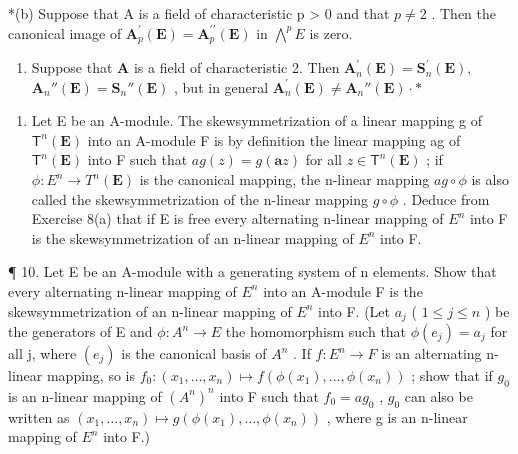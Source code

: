 *(b) Suppose that A is a field of characteristic p \textgreater{} 0 and that \(p \neq 2\) . Then the canonical image of \(\mathbf{A}_{p}^{\prime}(\mathbf{E}) = \mathbf{A}_{p}^{\prime\prime}(\mathbf{E})\) in \(\bigwedge^{p} E\) is zero.

\begin{enumerate}
\def\labelenumi{(\alph{enumi})}
\setcounter{enumi}{2}
\tightlist
\item
  Suppose that \(\mathbf{A}\) is a field of characteristic 2. Then \(\mathbf{A}_n^\prime (\mathbf{E}) = \mathbf{S}_n^\prime (\mathbf{E}),\) \(\mathbf{A}_n''(\mathbf{E}) = \mathbf{S}_n''(\mathbf{E})\) , but in general \(\mathbf{A}_n^\prime (\mathbf{E})\neq \mathbf{A}_n''(\mathbf{E})\cdot *\)
\end{enumerate}

\begin{enumerate}
\def\labelenumi{\arabic{enumi}.}
\setcounter{enumi}{8}
\tightlist
\item
  Let E be an A-module. The skewsymmetrization of a linear mapping g of \(\mathsf{T}^{n}(\mathbf{E})\) into an A-module F is by definition the linear mapping ag of \(\mathsf{T}^{n}(\mathbf{E})\) into F such that \(ag(z) = g(\boldsymbol{a}z)\) for all \(z \in \mathsf{T}^{n}(\mathbf{E})\) ; if \(\phi: E^{n} \to T^{n}(\mathbf{E})\) is the canonical mapping, the n-linear mapping \(ag \circ \phi\) is also called the skewsymmetrization of the n-linear mapping \(g \circ \phi\) . Deduce from Exercise 8(a) that if E is free every alternating n-linear mapping of \(E^{n}\) into F is the skewsymmetrization of an n-linear mapping of \(E^{n}\) into F.
\end{enumerate}

¶ 10. Let E be an A-module with a generating system of n elements. Show that every alternating n-linear mapping of \(E^{n}\) into an A-module F is the skewsymmetrization of an n-linear mapping of \(E^{n}\) into F. (Let \(a_{j}\) ( \(1 \leqslant j \leqslant n\) ) be the generators of E and \(\phi: A^{n} \rightarrow E\) the homomorphism such that \(\phi(e_{j}) = a_{j}\) for all j, where \((e_{j})\) is the canonical basis of \(A^{n}\) . If \(f: E^{n} \rightarrow F\) is an alternating n-linear mapping, so is \(f_{0}: (x_{1}, \ldots, x_{n}) \mapsto f(\phi(x_{1}), \ldots, \phi(x_{n}))\) ; show that if \(g_{0}\) is an n-linear mapping of \((A^{n})^{n}\) into F such that \(f_{0} = a g_{0}\) , \(g_{0}\) can also be written as \((x_{1}, \ldots, x_{n}) \mapsto g(\phi(x_{1}), \ldots, \phi(x_{n}))\) , where g is an n-linear mapping of \(E^{n}\) into F.)

